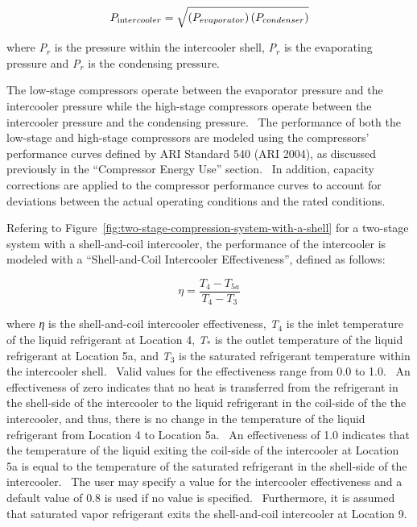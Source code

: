 \begin{equation}
{P_{{\mathop{\rm int}} ercooler}} = \sqrt {\left( {{P_{evaporator}}} \right)\left( {{P_{condenser}}} \right)}
\end{equation}

where \emph{P\(_{r}\)} is the pressure within the intercooler shell, \emph{P\(_{r}\)} is the evaporating pressure and \emph{P\(_{r}\)} is the condensing pressure.

The low-stage compressors operate between the evaporator pressure and the intercooler pressure while the high-stage compressors operate between the intercooler pressure and the condensing pressure.~ The performance of both the low-stage and high-stage compressors are modeled using the compressors' performance curves defined by ARI Standard 540 (ARI 2004), as discussed previously in the ``Compressor Energy Use'' section.~ In addition, capacity corrections are applied to the compressor performance curves to account for deviations between the actual operating conditions and the rated conditions.

Refering to Figure~\ref{fig:two-stage-compression-system-with-a-shell} for a two-stage system with a shell-and-coil intercooler, the performance of the intercooler is modeled with a ``Shell-and-Coil Intercooler Effectiveness'', defined as follows:

\begin{equation}
\eta  = \frac{{{T_4} - {T_{5a}}}}{{{T_4} - {T_3}}}
\end{equation}

where \emph{η} is the shell-and-coil intercooler effectiveness, \emph{T}\(_{4}\) is the inlet temperature of the liquid refrigerant at Location 4, \emph{T}\(_{*}\) is the outlet temperature of the liquid refrigerant at Location 5a, and \emph{T}\(_{3}\) is the saturated refrigerant temperature within the intercooler shell.~ Valid values for the effectiveness range from 0.0 to 1.0.~ An effectiveness of zero indicates that no heat is transferred from the refrigerant in the shell-side of the intercooler to the liquid refrigerant in the coil-side of the the intercooler, and thus, there is no change in the temperature of the liquid refrigerant from Location 4 to Location 5a.~ An effectiveness of 1.0 indicates that the temperature of the liquid exiting the coil-side of the intercooler at Location 5a is equal to the temperature of the saturated refrigerant in the shell-side of the intercooler.~ The user may specify a value for the intercooler effectiveness and a default value of 0.8 is used if no value is specified.~ Furthermore, it is assumed that saturated vapor refrigerant exits the shell-and-coil intercooler at Location 9.

